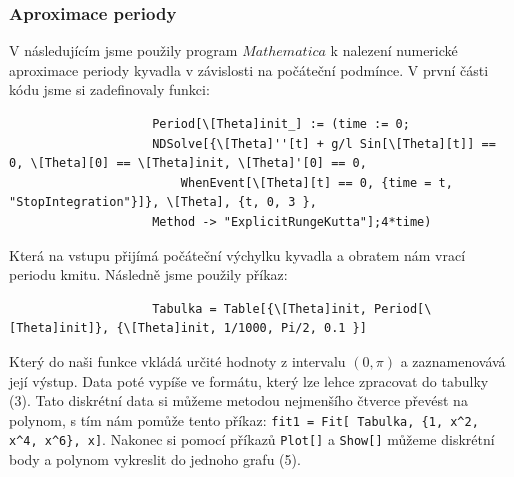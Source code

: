 \documentclass[reqno, a4paper]{amsart}
\begin{document}
				\subsubsection{Aproximace periody}
				\label{sec:aprox-periody}
				V následujícím jsme použily program $Mathematica$ k nalezení numerické aproximace periody kyvadla v závislosti na počáteční podmínce.
				V první části kódu jsme si zadefinovaly funkci:
				\begin{verbatim}
					Period[\[Theta]init_] := (time := 0;
					NDSolve[{\[Theta]''[t] + g/l Sin[\[Theta][t]] == 0, \[Theta][0] == \[Theta]init, \[Theta]'[0] == 0, 
						WhenEvent[\[Theta][t] == 0, {time = t, "StopIntegration"}]}, \[Theta], {t, 0, 3 }, 
					Method -> "ExplicitRungeKutta"];4*time)
				\end{verbatim}
				Která na vstupu přijímá počáteční výchylku kyvadla a obratem nám vrací periodu kmitu. Následně jsme použily příkaz: 
				\begin{verbatim}
					Tabulka = Table[{\[Theta]init, Period[\[Theta]init]}, {\[Theta]init, 1/1000, Pi/2, 0.1 }]
				\end{verbatim}
				Který do naši funkce vkládá určité hodnoty z intervalu $(0, \pi)$ a zaznamenovává její výstup. Data poté vypíše ve formátu, který lze lehce zpracovat do tabulky (3). Tato diskrétní data si můžeme metodou nejmenšího čtverce převést na polynom, s tím nám pomůže tento příkaz: \verb|fit1 = Fit[ Tabulka, {1, x^2,  x^4, x^6}, x]|. Nakonec si pomocí příkazů \verb|Plot[]| a \verb|Show[]| můžeme diskrétní body a polynom vykreslit do jednoho grafu (5).
				\\
				\\
				\\
				\\
				\\
				\\
\end{document}
